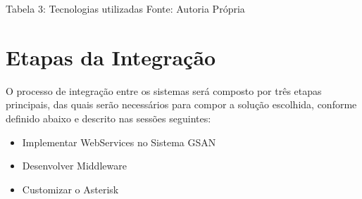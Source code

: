 \begin{center}
	Tabela 3: Tecnologias utilizadas 
	Fonte: Autoria Própria
\end{center}


\section{Etapas da Integração}
O processo de integração entre os sistemas será composto por três etapas principais, das quais serão necessários para compor a solução escolhida, conforme definido abaixo e descrito nas sessões seguintes:

\begin{itemize}
	\item Implementar WebServices no Sistema GSAN 
	\item Desenvolver Middleware
	\item Customizar o Asterisk	
\end{itemize}
